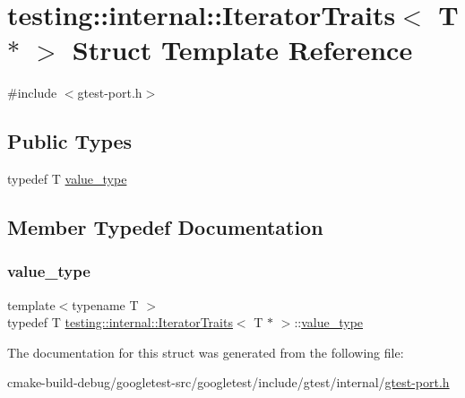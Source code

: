 \hypertarget{structtesting_1_1internal_1_1IteratorTraits_3_01T_01_5_01_4}{}\section{testing\+::internal\+::Iterator\+Traits$<$ T $\ast$ $>$ Struct Template Reference}
\label{structtesting_1_1internal_1_1IteratorTraits_3_01T_01_5_01_4}


{\ttfamily \#include $<$gtest-\/port.\+h$>$}

\subsection*{Public Types}
\begin{DoxyCompactItemize}
\item 
typedef T \mbox{\hyperlink{structtesting_1_1internal_1_1IteratorTraits_3_01T_01_5_01_4_a7e46869ed36cc5aea898e243d270a8be}{value\+\_\+type}}
\end{DoxyCompactItemize}


\subsection{Member Typedef Documentation}
\mbox{\label{structtesting_1_1internal_1_1IteratorTraits_3_01T_01_5_01_4_a7e46869ed36cc5aea898e243d270a8be}} 
\subsubsection{\texorpdfstring{value\_type}{value\_type}}
{\footnotesize\ttfamily template$<$typename T $>$ \\
typedef T \mbox{\hyperlink{structtesting_1_1internal_1_1IteratorTraits}{testing\+::internal\+::\+Iterator\+Traits}}$<$ T $\ast$ $>$\+::\mbox{\hyperlink{structtesting_1_1internal_1_1IteratorTraits_3_01T_01_5_01_4_a7e46869ed36cc5aea898e243d270a8be}{value\+\_\+type}}}



The documentation for this struct was generated from the following file\+:\begin{DoxyCompactItemize}
\item 
cmake-\/build-\/debug/googletest-\/src/googletest/include/gtest/internal/\mbox{\hyperlink{gtest-port_8h}{gtest-\/port.\+h}}\end{DoxyCompactItemize}
